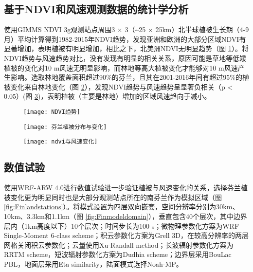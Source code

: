\subsection{基于NDVI和风速观测数据的统计学分析}

使用GIMMS NDVI 3g观测站点周围3 $ \times$ 3（\textasciitilde 25 $\times$ 25km）北半球植被生长期（4-9月）平均计算得到1982-2015年NDVI趋势，发现亚洲和欧洲的大部分区域NDVI有显著增加，表明植被有明显增加，相比之下，北美洲NDVI无明显趋势（图 \ref{fig:NDVItrend}）。将NDVI趋势与风速趋势对比，没有发现有明显的相关关系，原因可能是草地等低矮植被的变化对10 m风速无明显影响，而林地等高大植被变化才能够对10 m风速产生影响。选取林地覆盖面积超过90\%的芬兰，且其在2001-2016年间有超过95\%的植被变化来自林地变化（图 \ref{fig:Finlandvegetation}），发现NDVI趋势与风速趋势呈显著负相关（p < 0.05）(图 \ref{fig:FinlandwindvsNDVI})，表明植被（主要是林地）增加的区域风速趋向于减小。

\begin{figure}[!htbp]
    \centering
    \texttt{[image: NDVI趋势]}
        \label{fig:NDVItrend}
\end{figure}

\begin{figure}[!htbp]
    \centering
    \texttt{[image: 芬兰植被分布与变化]}
        \label{fig:Finlandvegetation}
\end{figure}

\begin{figure}[!t]
    \centering
    \texttt{[image: ndvi与风速变化]}
        \label{fig:FinlandwindvsNDVI}
\end{figure}

\subsection{数值试验}

使用WRF-ARW 4.0进行数值试验进一步验证植被与风速变化的关系，选择芬兰植被变化更为明显同时也是大部分观测站点所在的南芬兰作为模拟区域（图 \ref{fig:Finlandstations}）。将模式设置为四层双向嵌套，空间分辨率分别为30km、10km、3.3km和1.1km（图 \ref{fig:Finmodeldomain}），垂直包含40个层次，其中边界层内（1km高度以下）10个层次；时间步长为100 s；微物理参数化方案为WRF Single-Moment 6-class scheme；积云参数化方案为Grell 3D，在较高分辨率的两层网格关闭积云参数化；云量使用Xu-Randall method；长波辐射参数化方案为RRTM scheme，短波辐射参数化方案为Dudhia scheme；边界层采用BouLac PBL，地面层采用Eta similarity，陆面模式选择Noah-MP。

